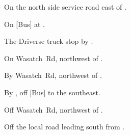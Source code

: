 
\begin{LocationList}

On the north side  service road east of .

On [Bus] at .

The Driverse truck stop by  .

\Location{\GarageHQ \Garage}
On Wasatch~Rd, northwest of  .

By Wasatch~Rd, northwest of  .

By  , off [Bus] to the southeast.

Off Wasatch~Rd, northwest of  .

Off the local road leading south from  .

\end{LocationList}
